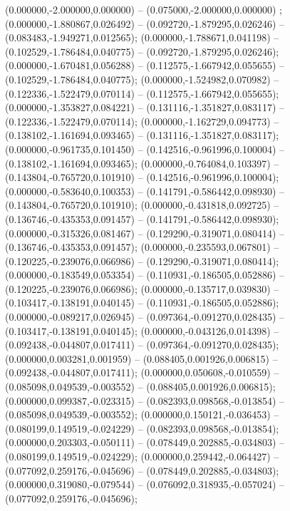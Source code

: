  (0.000000,-2.000000,0.000000) -- (0.075000,-2.000000,0.000000) ;
 (0.000000,-1.880867,0.026492) -- (0.092720,-1.879295,0.026246) -- (0.083483,-1.949271,0.012565);
 (0.000000,-1.788671,0.041198) -- (0.102529,-1.786484,0.040775) -- (0.092720,-1.879295,0.026246);
 (0.000000,-1.670481,0.056288) -- (0.112575,-1.667942,0.055655) -- (0.102529,-1.786484,0.040775);
 (0.000000,-1.524982,0.070982) -- (0.122336,-1.522479,0.070114) -- (0.112575,-1.667942,0.055655);
 (0.000000,-1.353827,0.084221) -- (0.131116,-1.351827,0.083117) -- (0.122336,-1.522479,0.070114);
 (0.000000,-1.162729,0.094773) -- (0.138102,-1.161694,0.093465) -- (0.131116,-1.351827,0.083117);
 (0.000000,-0.961735,0.101450) -- (0.142516,-0.961996,0.100004) -- (0.138102,-1.161694,0.093465);
 (0.000000,-0.764084,0.103397) -- (0.143804,-0.765720,0.101910) -- (0.142516,-0.961996,0.100004);
 (0.000000,-0.583640,0.100353) -- (0.141791,-0.586442,0.098930) -- (0.143804,-0.765720,0.101910);
 (0.000000,-0.431818,0.092725) -- (0.136746,-0.435353,0.091457) -- (0.141791,-0.586442,0.098930);
 (0.000000,-0.315326,0.081467) -- (0.129290,-0.319071,0.080414) -- (0.136746,-0.435353,0.091457);
 (0.000000,-0.235593,0.067801) -- (0.120225,-0.239076,0.066986) -- (0.129290,-0.319071,0.080414);
 (0.000000,-0.183549,0.053354) -- (0.110931,-0.186505,0.052886) -- (0.120225,-0.239076,0.066986);
 (0.000000,-0.135717,0.039830) -- (0.103417,-0.138191,0.040145) -- (0.110931,-0.186505,0.052886);
 (0.000000,-0.089217,0.026945) -- (0.097364,-0.091270,0.028435) -- (0.103417,-0.138191,0.040145);
 (0.000000,-0.043126,0.014398) -- (0.092438,-0.044807,0.017411) -- (0.097364,-0.091270,0.028435);
 (0.000000,0.003281,0.001959) -- (0.088405,0.001926,0.006815) -- (0.092438,-0.044807,0.017411);
 (0.000000,0.050608,-0.010559) -- (0.085098,0.049539,-0.003552) -- (0.088405,0.001926,0.006815);
 (0.000000,0.099387,-0.023315) -- (0.082393,0.098568,-0.013854) -- (0.085098,0.049539,-0.003552);
 (0.000000,0.150121,-0.036453) -- (0.080199,0.149519,-0.024229) -- (0.082393,0.098568,-0.013854);
 (0.000000,0.203303,-0.050111) -- (0.078449,0.202885,-0.034803) -- (0.080199,0.149519,-0.024229);
 (0.000000,0.259442,-0.064427) -- (0.077092,0.259176,-0.045696) -- (0.078449,0.202885,-0.034803);
 (0.000000,0.319080,-0.079544) -- (0.076092,0.318935,-0.057024) -- (0.077092,0.259176,-0.045696);

